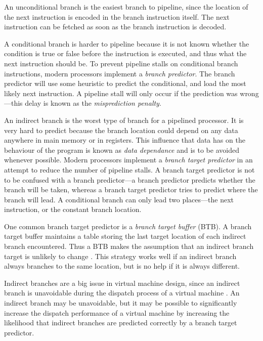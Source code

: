 			An unconditional branch is the easiest branch to pipeline, since the location of the next instruction is encoded in the branch instruction itself. The next instruction can be fetched as soon as the branch instruction is decoded. 
			
			A conditional branch is harder to pipeline because it is not known whether the condition is true or false before the instruction is executed, and thus what the next instruction should be. To prevent pipeline stalls on conditional branch instructions, modern processors implement a \emph{branch predictor}. The branch predictor will use some heuristic to predict the conditional, and load the most likely next instruction. A pipeline stall will only occur if the prediction was wrong---this delay is known as the \emph{misprediction penalty}.
			
			An indirect branch is the worst type of branch for a pipelined processor. It is very hard to predict because the branch location could depend on any data anywhere in main memory or in registers. This influence that data has on the behaviour of the program is known as \emph{data dependance} and is to be avoided whenever possible. Modern processors implement a \emph{branch target predictor} in an attempt to reduce the number of pipeline stalls. A branch target predictor is not to be confused with a branch predictor---a branch predictor predicts whether the branch will be taken, whereas a branch target predictor tries to predict where the branch will lead. A conditional branch can only lead two places---the next instruction, or the constant branch location.
			
			One common branch target predictor is a \emph{branch target buffer} (BTB). A branch target buffer maintains a table storing the last target location of each indirect branch encountered. Thus a BTB makes the assumption that an indirect branch target is unlikely to change  \citep{yeti}. This strategy works well if an indirect branch always branches to the same location, but is no help if it is always different.
			
			Indirect branches are a big issue in virtual machine design, since an indirect branch is unavoidable during the dispatch process of a virtual machine \citep{structureinterpreters}. An indirect branch may be unavoidable, but it may be possible to significantly increase the dispatch performance of a virtual machine by increasing the likelihood that indirect branches are predicted correctly by a branch target predictor.
			
